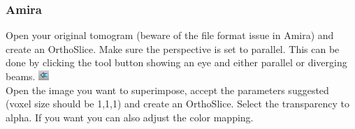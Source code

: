\documentclass[10pt,a4paper,onepage,DIV12]{scrartcl}
\begin{document}
\subsubsection*{Amira}
Open your original tomogram (beware of the file format issue in Amira) and create an OrthoSlice. Make sure the perspective is set to parallel. This can be done by clicking the tool button showing an eye and either parallel or diverging beams. \includegraphics[width=0.03\textwidth]{images/perspective.png}\\Open the image you want to superimpose, accept the parameters suggested (voxel size should be 1,1,1) and create an OrthoSlice. Select the transparency to alpha. If you want you can also adjust the color mapping. 
\end{document}
